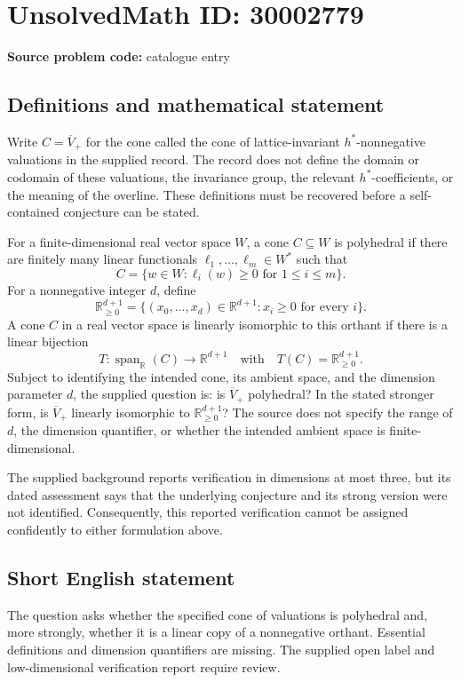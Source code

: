 \documentclass[11pt]{article}
\newcommand{\R}{\mathbb{R}}
\begin{document}
\section*{UnsolvedMath ID: 30002779}
\textbf{Source problem code:} catalogue entry
\subsection{Definitions and mathematical statement}
Write \(C=\overline{V}_+\) for the cone called the cone of lattice-invariant \(h^*\)-nonnegative valuations in the supplied record. The record does not define the domain or codomain of these valuations, the invariance group, the relevant \(h^*\)-coefficients, or the meaning of the overline. These definitions must be recovered before a self-contained conjecture can be stated.

For a finite-dimensional real vector space \(W\), a cone \(C\subseteq W\) is polyhedral if there are finitely many linear functionals \(\ell_1,\ldots,\ell_m\in W^*\) such that
\[
C=\{w\in W:\ell_i(w)\geq 0\text{ for }1\leq i\leq m\}.
\]
For a nonnegative integer \(d\), define
\[
\R_{\geq 0}^{d+1}=\{(x_0,\ldots,x_d)\in\R^{d+1}:x_i\geq 0\text{ for every }i\}.
\]
A cone \(C\) in a real vector space is linearly isomorphic to this orthant if there is a linear bijection
\[
T:\operatorname{span}_{\R}(C)\longrightarrow\R^{d+1}
\quad\text{with}\quad T(C)=\R_{\geq 0}^{d+1}.
\]
Subject to identifying the intended cone, its ambient space, and the dimension parameter \(d\), the supplied question is: is \(\overline{V}_+\) polyhedral? In the stated stronger form, is \(\overline{V}_+\) linearly isomorphic to \(\R_{\geq 0}^{d+1}\)? The source does not specify the range of \(d\), the dimension quantifier, or whether the intended ambient space is finite-dimensional.

The supplied background reports verification in dimensions at most three, but its dated assessment says that the underlying conjecture and its strong version were not identified. Consequently, this reported verification cannot be assigned confidently to either formulation above.
\subsection{Short English statement}
The question asks whether the specified cone of valuations is polyhedral and, more strongly, whether it is a linear copy of a nonnegative orthant. Essential definitions and dimension quantifiers are missing. The supplied open label and low-dimensional verification report require review.
\end{document}
